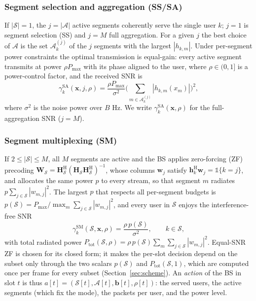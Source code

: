 \documentclass[journal]{IEEEtran}
\newcommand{\Pmax}{P_{\max}}
\newcommand{\vect}[1]{\bm{#1}}
\newcommand{\Sset}{\mathcal{S}}
\begin{document}
\subsubsection{Segment selection and aggregation (SS/SA)} If $|\Sset|=1$, the $j=|\mathcal A|$ active segments coherently serve the single user $k$; $j=1$ is segment selection (SS) and $j=M$ full aggregation. For a given $j$ the best choice of $\mathcal A$ is the set $\mathcal A_k^{(j)}$ of the $j$ segments with the largest $|h_{k,m}|$. Under per-segment power constraints the optimal transmission is equal-gain: every active segment transmits at power $\rho\Pmax$ with its phase aligned to the user, where $\rho\in(0,1]$ is a power-control factor, and the received SNR is
\begin{equation}\label{eq:snr_sa}
\gamma_k^{\mathrm{SA}}(\vect x,j,\rho)=\frac{\rho\Pmax}{\sigma^2}\Big(\sum_{m\in\mathcal A_k^{(j)}}|h_{k,m}(x_m)|\Big)^2,
\end{equation}
where $\sigma^2$ is the noise power over $B$ Hz. We write $\gamma_k^{\mathrm{SA}}(\vect x,\rho)$ for the full-aggregation SNR ($j=M$).

\subsubsection{Segment multiplexing (SM)} If $2\le|\Sset|\le M$, all $M$ segments are active and the BS applies zero-forcing (ZF) precoding $\vect W_{\Sset}=\vect H_{\Sset}^{\mathrm H}(\vect H_{\Sset}\vect H_{\Sset}^{\mathrm H})^{-1}$, whose columns $\vect w_j$ satisfy $\vect h_k^{\mathrm H}\vect w_j=\mathbb 1\{k=j\}$, and allocates the same power $p$ to every stream, so that segment $m$ radiates $p\sum_{j\in\Sset}|w_{m,j}|^2$. The largest $p$ that respects all per-segment budgets is $p(\Sset)=\Pmax/\max_m\sum_{j\in\Sset}|w_{m,j}|^2$, and every user in $\Sset$ enjoys the interference-free SNR
\begin{equation}\label{eq:snr_sm}
\gamma_k^{\mathrm{SM}}(\Sset,\vect x,\rho)=\frac{\rho\,p(\Sset)}{\sigma^2},\qquad k\in\Sset,
\end{equation}
with total radiated power $P_{\mathrm{tot}}(\Sset,\rho)=\rho\,p(\Sset)\sum_{m}\sum_{j\in\Sset}|w_{m,j}|^2$. Equal-SNR ZF is chosen for its closed form; it makes the per-slot decision depend on the subset only through the two scalars $p(\Sset)$ and $P_{\mathrm{tot}}(\Sset,1)$, which are computed once per frame for every subset (Section~\ref{sec:scheme}). An \emph{action} of the BS in slot $t$ is thus $a[t]=(\Sset[t],\mathcal A[t],\vect b[t],\rho[t])$: the served users, the active segments (which fix the mode), the packets per user, and the power level.
\end{document}
